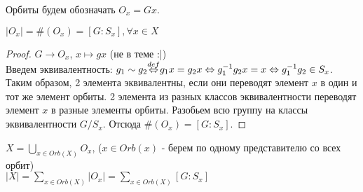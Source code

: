 Орбиты будем обозначать $O_x = Gx$.

\begin{thm}
$|O_x| = \#(O_x) = [G : S_x], \forall x \in X$
\end{thm}
\begin{proof}
$G \rightarrow O_x$, $x \mapsto gx$ (не в теме :|)\\
Введем эквивалентность: $g_1 \sim g_2 {\buildrel{def}\over{\Leftrightarrow}} g_1x = g_2x
\Leftrightarrow g^{-1}_1g_2x = x \Leftrightarrow g^{-1}_1g_2 \in S_x$. Таким образом, 2 элемента эквивалентны, если они
переводят элемент $x$ в один и тот же элемент орбиты. 2 элемента из разных классов эквивалентности переводят элемент $x$ в
разные элементы орбиты. Разобьем всю группу на классы эквивалентности $G/S_x$. Отсюда $\#(O_x) = [G : S_x]$.
\end{proof}

\begin{thm}
$X = {\underset{x \in Orb(X)}{\bigcup}}O_x$, ($x \in Orb(x)$ - берем по одному представителю со всех орбит) \\
$|X| = {\underset{x \in Orb(X)}{\sum}}|O_x| = {\underset{x \in Orb(X)}{\sum}}[G : S_x]$
\end{thm}


